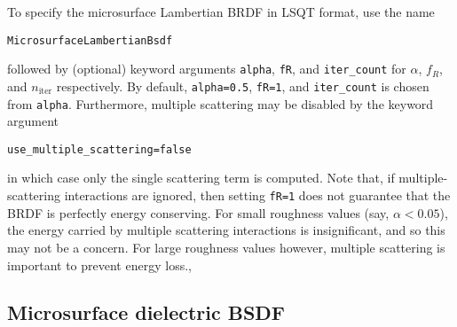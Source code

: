 \documentclass[
    twoside,
    twocolumn,
    letterpaper,
    defaultfont,
    rmheading,
    10pt]{article}
\begin{document}
To specify the microsurface Lambertian BRDF in LSQT format, use the 
name 
\begin{verbatim}
MicrosurfaceLambertianBsdf
\end{verbatim}
followed by (optional) keyword arguments 
\texttt{alpha}, \texttt{fR}, and \texttt{iter\_count} for $\alpha$,
$f_R$, and $n_{\text{iter}}$ respectively. By default, \texttt{alpha=0.5},
\texttt{fR=1}, and \texttt{iter\_count} is chosen from \texttt{alpha}.
Furthermore, multiple scattering may be disabled by the keyword argument
\begin{verbatim}
use_multiple_scattering=false
\end{verbatim}
in which case only the single scattering term is computed. Note that,
if multiple-scattering interactions are ignored, then setting \texttt{fR=1}
does not guarantee that the BRDF is perfectly energy conserving. 
For small roughness values (say, $\alpha < 0.05$), the energy carried by 
multiple scattering interactions is insignificant, and so this may not be a
concern. For large roughness values however, multiple scattering is important
to prevent energy loss.,

\subsection{Microsurface dielectric BSDF}



{
\nocite{*}
\raggedright
\printbibliography
}
\end{document}
